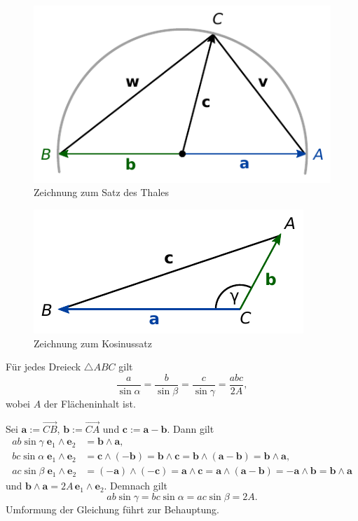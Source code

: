 \begin{figure}[b!]
\centering
\includegraphics{img/Thales.pdf}
\caption{Zeichnung zum Satz des Thales}
\end{figure}

\begin{figure}[b!]
\centering
\includegraphics{img/Kosinussatz.pdf}
\caption{Zeichnung zum Kosinussatz}
\end{figure}

\newpage
\begin{Satz}[Sinussatz]
Für jedes Dreieck $\triangle ABC$ gilt
\[\frac{a}{\sin\alpha} = \frac{b}{\sin\beta} = \frac{c}{\sin\gamma}
= \frac{abc}{2A},\]
wobei $A$ der Flächeninhalt ist.
\end{Satz}
\begin{Beweis}
Sei $\mathbf a := \overrightarrow{CB}$, $\mathbf b:= \overrightarrow{CA}$
und $\mathbf c := \mathbf a-\mathbf b$. Dann gilt
\begin{align*}
ab\sin\gamma\;\mathbf e_1\wedge\mathbf e_2 &= \mathbf b\wedge\mathbf a,\\
bc\sin\alpha\;\mathbf e_1\wedge\mathbf e_2 &= \mathbf c\wedge(-\mathbf b)
= \mathbf b\wedge\mathbf c = \mathbf b\wedge (\mathbf a-\mathbf b)
= \mathbf b\wedge\mathbf a,\\
ac\sin\beta\;\mathbf e_1\wedge\mathbf e_2 &= (-\mathbf a)\wedge (-\mathbf c)
= \mathbf a\wedge\mathbf c
= \mathbf a\wedge(\mathbf a-\mathbf b)
= -\mathbf a\wedge\mathbf b = \mathbf b\wedge\mathbf a
\end{align*}
und $\mathbf b\wedge\mathbf a = 2A\,\mathbf e_1\wedge\mathbf e_2$.
Demnach gilt
\[ab\sin\gamma = bc\sin\alpha = ac\sin\beta = 2A.\]
Umformung der Gleichung führt zur Behauptung.\;\qedsymbol
\end{Beweis}

